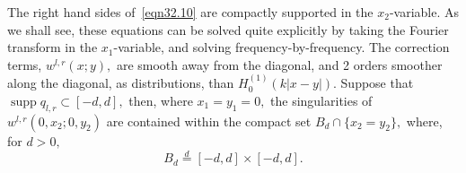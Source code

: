 \documentclass[11pt]{article}
\newcommand\fE{\mathfrak E}
\newcommand\supp{\operatorname{supp}}
\theoremstyle{definition}
\theoremstyle{remark}
\begin{document}
 The right hand sides of~\eqref{eqn32.10} are compactly supported in the
 $x_2$-variable. As we shall see, these equations can be solved quite
 explicitly by taking the Fourier transform in the $x_1$-variable, and
 solving frequency-by-frequency. The correction terms, $w^{l,r}(x;y),$
 are smooth away from the diagonal, and 2 orders smoother along the diagonal, as
 distributions, than $H^{(1)}_0(k|x-y|).$ Suppose that $\supp q_{l,r}\subset
 [-d,d],$ then, where $x_1=y_1=0,$ the singularities of $w^{l,r}(0,x_2;0,y_2)$
 are contained within the compact set $B_d\cap\{x_2=y_2\},$ where, for $d>0,$
  \begin{equation}
     B_d\overset{d}{=}[-d,d]\times[-d,d].
  \end{equation}
\end{document}
